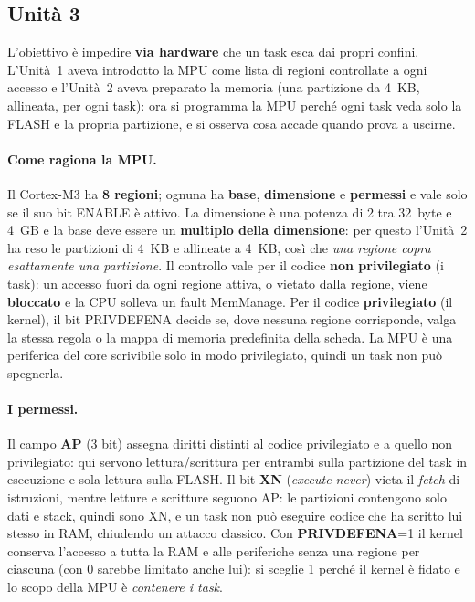\subsection{Unità 3}
L'obiettivo è impedire \textbf{via hardware} che un task esca dai propri confini. L'Unità~1 aveva
introdotto la MPU come lista di regioni controllate a ogni accesso e l'Unità~2 aveva preparato la
memoria (una partizione da 4~KB, allineata, per ogni task): ora si programma la MPU perché ogni
task veda solo la FLASH e la propria partizione, e si osserva cosa accade quando prova a uscirne.

\paragraph*{Come ragiona la MPU.}
Il Cortex-M3 ha \textbf{8 regioni}; ognuna ha \textbf{base}, \textbf{dimensione} e
\textbf{permessi} e vale solo se il suo bit ENABLE è attivo. La dimensione è una potenza di 2
tra 32~byte e 4~GB e la base deve essere un \textbf{multiplo della dimensione}: per questo
l'Unità~2 ha reso le partizioni di 4~KB e allineate a 4~KB, così che \emph{una regione copra
esattamente una partizione}. Il controllo vale per il codice \textbf{non privilegiato} (i task):
un accesso fuori da ogni regione attiva, o vietato dalla regione, viene \textbf{bloccato} e la
CPU solleva un fault MemManage. Per il codice \textbf{privilegiato} (il kernel), il bit
PRIVDEFENA decide se, dove nessuna regione corrisponde, valga la stessa regola o la mappa di
memoria predefinita della scheda. La MPU è una periferica del core scrivibile solo in modo
privilegiato, quindi un task non può spegnerla.

\paragraph*{I permessi.}
Il campo \textbf{AP} (3 bit) assegna diritti distinti al codice privilegiato e a quello non
privilegiato: qui servono lettura/scrittura per entrambi sulla partizione del task in esecuzione
e sola lettura sulla FLASH. Il bit \textbf{XN} (\emph{execute never}) vieta il \emph{fetch} di
istruzioni, mentre letture e scritture seguono AP: le partizioni contengono solo dati e stack,
quindi sono XN, e un task non può eseguire codice che ha scritto lui stesso in RAM, chiudendo un
attacco classico. Con \textbf{PRIVDEFENA}=1 il kernel conserva l'accesso a tutta la RAM e alle
periferiche senza una regione per ciascuna (con 0 sarebbe limitato anche lui): si sceglie 1
perché il kernel è fidato e lo scopo della MPU è \emph{contenere i task}.


